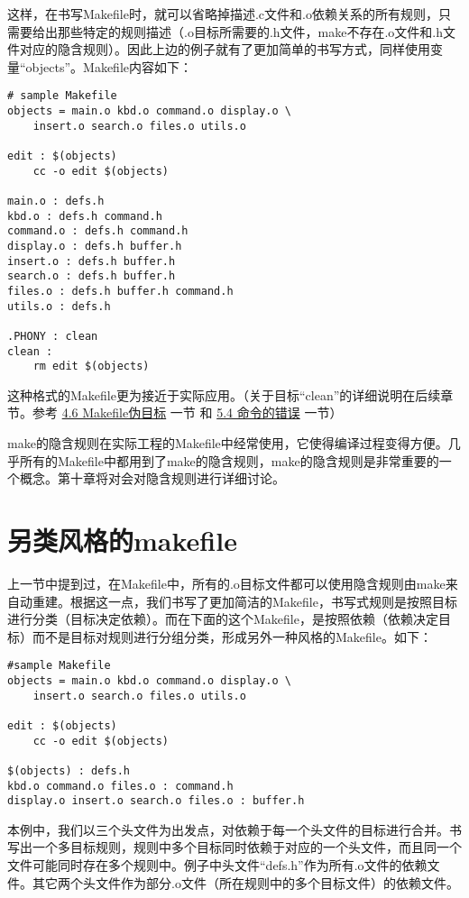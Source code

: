 这样，在书写Makefile时，就可以省略掉描述.c文件和.o依赖关系的所有规则，只需要给出那些特定的规则描述（.o目标所需要的.h文件，make不存在.o文件和.h文件对应的隐含规则）。因此上边的例子就有了更加简单的书写方式，同样使用变量“objects”。Makefile内容如下：


\begin{Verbatim}[]
# sample Makefile
objects = main.o kbd.o command.o display.o \
    insert.o search.o files.o utils.o

edit : $(objects)
    cc -o edit $(objects)

main.o : defs.h
kbd.o : defs.h command.h
command.o : defs.h command.h
display.o : defs.h buffer.h
insert.o : defs.h buffer.h
search.o : defs.h buffer.h
files.o : defs.h buffer.h command.h
utils.o : defs.h

.PHONY : clean
clean :
    rm edit $(objects)
\end{Verbatim}

这种格式的Makefile更为接近于实际应用。（关于目标“clean”的详细说明在后续章节。参考 \hyperref[sec:4.6]{4.6 Makefile伪目标} 一节 和 \hyperref[sec:5.4]{5.4 命令的错误} 一节）

make的隐含规则在实际工程的Makefile中经常使用，它使得编译过程变得方便。几乎所有的Makefile中都用到了make的隐含规则，make的隐含规则是非常重要的一个概念。第十章将对会对隐含规则进行详细讨论。


\section{另类风格的makefile}
上一节中提到过，在Makefile中，所有的.o目标文件都可以使用隐含规则由make来自动重建。根据这一点，我们书写了更加简洁的Makefile，书写式规则是按照目标进行分类（目标决定依赖）。而在下面的这个Makefile，是按照依赖（依赖决定目标）而不是目标对规则进行分组分类，形成另外一种风格的Makefile。如下：

\begin{Verbatim}[]
#sample Makefile
objects = main.o kbd.o command.o display.o \
    insert.o search.o files.o utils.o

edit : $(objects)
    cc -o edit $(objects)

$(objects) : defs.h
kbd.o command.o files.o : command.h
display.o insert.o search.o files.o : buffer.h
\end{Verbatim}

本例中，我们以三个头文件为出发点，对依赖于每一个头文件的目标进行合并。书写出一个多目标规则，规则中多个目标同时依赖于对应的一个头文件，而且同一个文件可能同时存在多个规则中。例子中头文件“defs.h”作为所有.o文件的依赖文件。其它两个头文件作为部分.o文件（所在规则中的多个目标文件）的依赖文件。

